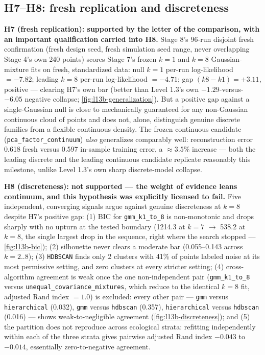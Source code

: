 \subsection{H7--H8: fresh replication and discreteness}
\label{sec:level13b-h7h8}

\textbf{H7 (fresh replication): supported by the letter of the comparison,
with an important qualification carried into H8.} Stage 8's 96-run
disjoint fresh confirmation (fresh design seed, fresh simulation seed
range, never overlapping Stage 4's own 240 points) scores Stage 7's frozen
$k{=}1$ and $k{=}8$ Gaussian-mixture fits on fresh, standardized data:
null $k{=}1$ per-run log-likelihood $=-7.82$; leading $k{=}8$ per-run
log-likelihood $=-4.71$; gap $(k8-k1)=+3.11$, positive --- clearing H7's
own bar (better than Level 1.3's own $-1.29$-versus-$-6.05$ negative
collapse; \cref{fig:l13b-generalization}). But a positive gap against a
single-Gaussian null is close to mechanically guaranteed for any
non-Gaussian continuous cloud of points and does not, alone, distinguish
genuine discrete families from a flexible continuous density. The frozen
continuous candidate (\texttt{pca\_factor\_continuum}) \textit{also}
generalizes comparably well: reconstruction error 0.618 fresh versus 0.597
in-sample training error, a $\approx3.5\%$ increase --- both the leading
discrete and the leading continuous candidate replicate reasonably this
milestone, unlike Level 1.3's own sharp discrete-model collapse.

\textbf{H8 (discreteness): not supported --- the weight of evidence leans
continuum, and this hypothesis was explicitly licensed to fail.} Five
independent, converging signals argue against genuine discreteness at
$k{=}8$ despite H7's positive gap: (1) BIC for \texttt{gmm\_k1\_to\_8} is
non-monotonic and drops sharply with no upturn at the tested boundary
(1214.3 at $k{=}7$ $\to$ 538.2 at $k{=}8$, the single largest drop in the
sequence, right where the search stopped ---
\cref{fig:l13b-bic}); (2) silhouette never clears a moderate bar
(0.055--0.143 across $k{=}2..8$); (3) \texttt{HDBSCAN} finds only 2
clusters with 41\% of points labeled noise at its most permissive setting,
and zero clusters at every stricter setting; (4) cross-algorithm agreement
is weak once the one non-independent pair (\texttt{gmm\_k1\_to\_8} versus
\texttt{unequal\_covariance\_mixtures}, which reduce to the identical
$k{=}8$ fit, adjusted Rand index $=1.0$) is excluded: every other pair ---
\texttt{gmm} versus \texttt{hierarchical} (0.032), \texttt{gmm} versus
\texttt{hdbscan} (0.357), \texttt{hierarchical} versus \texttt{hdbscan}
(0.016) --- shows weak-to-negligible agreement (\cref{fig:l13b-discreteness}); and
(5) the partition does not reproduce across ecological strata: refitting
independently within each of the three strata gives pairwise adjusted Rand
index $-0.043$ to $-0.014$, essentially zero-to-negative agreement.

